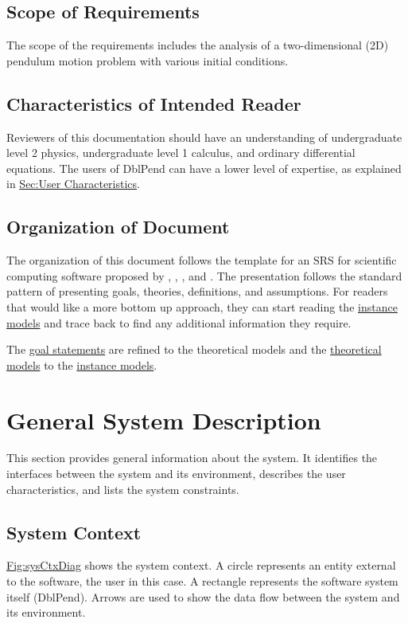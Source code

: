 \documentclass[12pt]{article}
\begin{document}
{\subsection{Scope of Requirements}
\label{Sec:ReqsScope}
The scope of the requirements includes the analysis of a two-dimensional (2D) pendulum motion problem with various initial conditions.

\subsection{Characteristics of Intended Reader}
\label{Sec:ReaderChars}
Reviewers of this documentation should have an understanding of undergraduate level 2 physics, undergraduate level 1 calculus, and ordinary differential equations. The users of DblPend can have a lower level of expertise, as explained in \hyperref[Sec:UserChars]{Sec:User Characteristics}.

\subsection{Organization of Document}
\label{Sec:DocOrg}
The organization of this document follows the template for an SRS for scientific computing software proposed by \cite{koothoor2013}, \cite{smithLai2005}, \cite{smithEtAl2007}, and \cite{smithKoothoor2016}. The presentation follows the standard pattern of presenting goals, theories, definitions, and assumptions. For readers that would like a more bottom up approach, they can start reading the \hyperref[Sec:IMs]{instance models} and trace back to find any additional information they require.

The \hyperref[Sec:GoalStmt]{goal statements} are refined to the theoretical models and the \hyperref[Sec:TMs]{theoretical models} to the \hyperref[Sec:IMs]{instance models}.

\section{General System Description}
\label{Sec:GenSysDesc}
This section provides general information about the system. It identifies the interfaces between the system and its environment, describes the user characteristics, and lists the system constraints.

\subsection{System Context}
\label{Sec:SysContext}
\hyperref[Figure:sysCtxDiag]{Fig:sysCtxDiag} shows the system context. A circle represents an entity external to the software, the user in this case. A rectangle represents the software system itself (DblPend). Arrows are used to show the data flow between the system and its environment.

}
\end{document}
